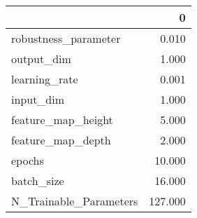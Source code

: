 \begin{tabular}{lr}
\toprule
{} &        0 \\
\midrule
robustness\_parameter   &    0.010 \\
output\_dim             &    1.000 \\
learning\_rate          &    0.001 \\
input\_dim              &    1.000 \\
feature\_map\_height     &    5.000 \\
feature\_map\_depth      &    2.000 \\
epochs                 &   10.000 \\
batch\_size             &   16.000 \\
N\_Trainable\_Parameters &  127.000 \\
\bottomrule
\end{tabular}
